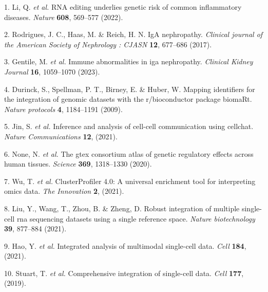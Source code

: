 \documentclass[
]{article}
\newenvironment{cslreferences}%
  {}%
  {\par}
\begin{document}
\hypertarget{refs}{}
\begin{cslreferences}
\leavevmode\hypertarget{ref-RnaEditingUndLiQi2022}{}%
1. Li, Q. \emph{et al.} RNA editing underlies genetic risk of common inflammatory diseases. \emph{Nature} \textbf{608}, 569--577 (2022).

\leavevmode\hypertarget{ref-IgaNephropathyRodrig2017}{}%
2. Rodrigues, J. C., Haas, M. \& Reich, H. N. IgA nephropathy. \emph{Clinical journal of the American Society of Nephrology : CJASN} \textbf{12}, 677--686 (2017).

\leavevmode\hypertarget{ref-ImmuneAbnormalGentil2023}{}%
3. Gentile, M. \emph{et al.} Immune abnormalities in iga nephropathy. \emph{Clinical Kidney Journal} \textbf{16}, 1059--1070 (2023).

\leavevmode\hypertarget{ref-MappingIdentifDurinc2009}{}%
4. Durinck, S., Spellman, P. T., Birney, E. \& Huber, W. Mapping identifiers for the integration of genomic datasets with the r/bioconductor package biomaRt. \emph{Nature protocols} \textbf{4}, 1184--1191 (2009).

\leavevmode\hypertarget{ref-InferenceAndAJinS2021}{}%
5. Jin, S. \emph{et al.} Inference and analysis of cell-cell communication using cellchat. \emph{Nature Communications} \textbf{12}, (2021).

\leavevmode\hypertarget{ref-TheGtexConsorNone2020}{}%
6. None, N. \emph{et al.} The gtex consortium atlas of genetic regulatory effects across human tissues. \emph{Science} \textbf{369}, 1318--1330 (2020).

\leavevmode\hypertarget{ref-ClusterprofilerWuTi2021}{}%
7. Wu, T. \emph{et al.} ClusterProfiler 4.0: A universal enrichment tool for interpreting omics data. \emph{The Innovation} \textbf{2}, (2021).

\leavevmode\hypertarget{ref-RobustIntegratLiuY2021}{}%
8. Liu, Y., Wang, T., Zhou, B. \& Zheng, D. Robust integration of multiple single-cell rna sequencing datasets using a single reference space. \emph{Nature biotechnology} \textbf{39}, 877--884 (2021).

\leavevmode\hypertarget{ref-IntegratedAnalHaoY2021}{}%
9. Hao, Y. \emph{et al.} Integrated analysis of multimodal single-cell data. \emph{Cell} \textbf{184}, (2021).

\leavevmode\hypertarget{ref-ComprehensiveIStuart2019}{}%
10. Stuart, T. \emph{et al.} Comprehensive integration of single-cell data. \emph{Cell} \textbf{177}, (2019).
\end{cslreferences}
\end{document}
